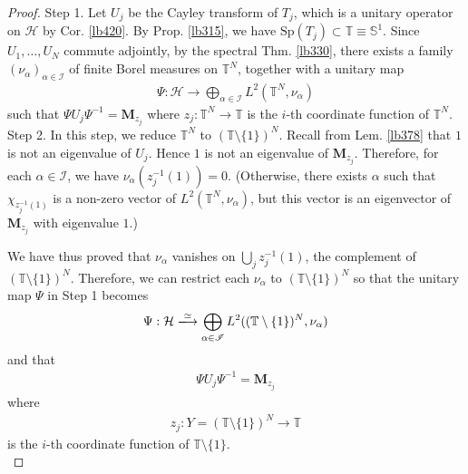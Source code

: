 \documentclass[12pt,b5paper,notitlepage]{article}
\theoremstyle{definition}
\theoremstyle{plain}
\newcommand{\Tbb}{\mathbb T}
\newcommand{\Sp}{\mathrm{Sp}}
\newcommand{\Sbb}{{\mathbb S}}
\newcommand{\MH}{\mathcal H}
\newcommand{\SI}{\mathscr I}
\newcommand{\Mbf}{\mathbf M}
\numberwithin{equation}{section}
\begin{document}
\begin{proof}
Step 1. Let $U_j$ be the Cayley transform of $T_j$, which is a unitary operator on $\MH$ by Cor. \ref{lb420}. By Prop. \ref{lb315}, we have $\Sp(T_j)\subset\Tbb\equiv\Sbb^1$. Since $U_1,\dots,U_N$ commute adjointly, by the spectral Thm. \ref{lb330}, there exists a family $(\nu_\alpha)_{\alpha\in\SI}$ of finite Borel measures on $\Tbb^N$, together with a unitary map
\begin{align*}
\Psi:\MH\rightarrow\bigoplus_{\alpha\in\SI}L^2(\Tbb^N,\nu_\alpha)
\end{align*}
such that $\Psi U_j\Psi^{-1}=\Mbf_{z_j}$ where $z_j:\Tbb^N\rightarrow\Tbb$ is the $i$-th coordinate function of $\Tbb^N$.\\[-1ex]


Step 2. In this step, we reduce $\Tbb^N$ to $(\Tbb\setminus\{1\})^N$. Recall from Lem. \ref{lb378} that $1$ is not an eigenvalue of $U_j$. Hence $1$ is not an eigenvalue of $\Mbf_{z_j}$. Therefore, for each $\alpha\in\SI$, we have $\nu_\alpha(z_j^{-1}(1))=0$. (Otherwise, there exists $\alpha$ such that $\chi_{z_j^{-1}(1)}$ is a non-zero vector of $L^2(\Tbb^N,\nu_\alpha)$, but this vector is an eigenvector of $\Mbf_{z_j}$ with eigenvalue $1$.) 

We have thus proved that $\nu_\alpha$ vanishes on $\bigcup_j z_j^{-1}(1)$, the complement of $(\Tbb\setminus\{1\})^N$. Therefore, we can restrict each $\nu_\alpha$ to $(\Tbb\setminus\{1\})^N$ so that the unitary map $\Psi$ in Step 1 becomes
\begin{align*}
\Psi:\MH\xlongrightarrow{\simeq}\bigoplus_{\alpha\in\SI}L^2((\Tbb\setminus\{1\})^N,\nu_\alpha)
\end{align*}
and that
\begin{align}\label{eq226}
\Psi U_j\Psi^{-1}=\Mbf_{z_j}
\end{align}
where 
\begin{align*}
z_j:Y=(\Tbb\setminus\{1\})^N\rightarrow\Tbb
\end{align*}
is the $i$-th coordinate function of $\Tbb\setminus\{1\}$.\\[-1ex]


\end{proof}
\end{document}
